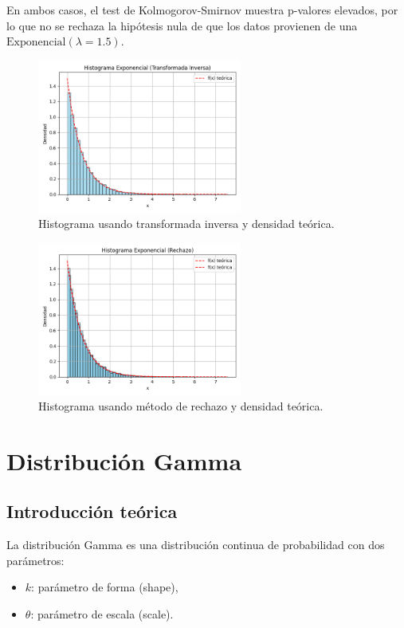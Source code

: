 \documentclass{article}
\begin{document}
En ambos casos, el test de Kolmogorov-Smirnov muestra p-valores elevados, por lo que no se rechaza la hipótesis nula de que los datos provienen de una $\text{Exponencial}(\lambda = 1.5)$.

\begin{figure}[H]
    \centering
    \includegraphics[width=0.6\textwidth]{visualizaciones/exponencial_Transformada Inversa.png}
    \caption{Histograma usando transformada inversa y densidad teórica.}
\end{figure}

\begin{figure}[H]
    \centering
    \includegraphics[width=0.6\textwidth]{visualizaciones/exponencial_Rechazo.png}
    \caption{Histograma usando método de rechazo y densidad teórica.}
\end{figure}

\section{Distribución Gamma}

\subsection{Introducción teórica}

La distribución Gamma es una distribución continua de probabilidad con dos parámetros:
\begin{itemize}
    \item $k$: parámetro de forma (shape),
    \item $\theta$: parámetro de escala (scale).
\end{itemize}
\end{document}
